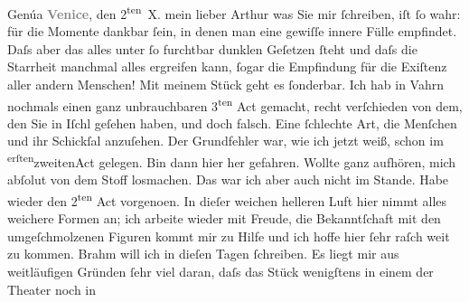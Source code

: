 \begin{ledgroupsized}[t]{13cm}
{{                     Genúa}}\pend
           \pstart
           \raggedleft{}\textcolor{gray}{\textbf{Venice}}, den 2\textsuperscript{ten} X.\pend
           \pstart{}mein lieber Arthur\pend\pstart
           was Sie mir ſchreiben, iſt ſo wahr: für die Momente dankbar ſein, in denen man eine
               gewiſſe innere Fülle empfindet. Daſs aber das alles unter ſo furchtbar dunklen
               Geſetzen ſteht und daſs die Starrheit manchmal alles ergreifen {\pb}kann, ſogar die Empfindung für die
               Exiſtenz aller andern Menschen!\pend
           \pstart
           Mit meinem Stück geht es
               ſonderbar. Ich hab in Vahrn nochmals einen ganz
               unbrauchbaren 3\textsuperscript{ten} Act gemacht, recht verſchieden von
               dem, den Sie in Iſchl geſehen haben, und doch
               falsch. Eine ſchlechte Art, die Menſchen und ihr Schickſal anzuſehen. Der Grundfehler
               war, wie ich jetzt weiß, schon im \substVorne{}\textsuperscript{erſten}{\allowbreak}\substDazwischen{}zweiten\substHinten{}{ }Act gelegen. Bin dann hier her gefahren. Wollte ganz
               aufhören, mich abſolut von dem Stoff losmachen. Das war ich aber auch nicht im
               Stande. Habe wieder den 2\textsuperscript{ten}{ }Act vorgeno{\geminationm}en. In dieſer weichen helleren Luft hier {\pb}nimmt alles weichere Formen an;
               ich arbeite wieder mit Freude, die Bekanntſchaft mit den umgeſchmolzenen Figuren
               kommt mir zu Hilfe und ich hoffe hier ſehr raſch weit zu kommen.\pend
           \pstart
           Brahm will ich in dieſen Tagen ſchreiben. Es
               liegt mir aus weitläufigen Gründen ſehr viel daran, daſs das Stück wenigſtens in einem der Theater noch in

\end{ledgroupsized}
